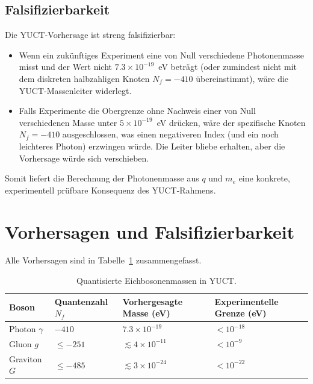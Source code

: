 \documentclass[12pt,a4paper]{article}
\begin{document}
	\subsection{Falsifizierbarkeit}
	
	Die YUCT-Vorhersage ist streng falsifizierbar:
	\begin{itemize}
		\item Wenn ein zukünftiges Experiment eine von Null verschiedene Photonenmasse misst und der Wert
		nicht \(7.3\times10^{-19}\)~eV beträgt (oder zumindest nicht mit dem diskreten halbzahligen Knoten
		\(N_f = -410\) übereinstimmt), wäre die YUCT-Massenleiter widerlegt.
		\item Falls Experimente die Obergrenze ohne Nachweis einer von Null verschiedenen Masse unter
		\(5\times10^{-19}\)~eV drücken, wäre der spezifische Knoten \(N_f = -410\) ausgeschlossen, was einen
		negativeren Index (und ein noch leichteres Photon) erzwingen würde. Die Leiter bliebe erhalten,
		aber die Vorhersage würde sich verschieben.
	\end{itemize}
	Somit liefert die Berechnung der Photonenmasse aus \(q\) und \(m_e\) eine konkrete, experimentell prüfbare
	Konsequenz des YUCT-Rahmens.
	
	\clearpage
	\section{Vorhersagen und Falsifizierbarkeit}
	
	Alle Vorhersagen sind in Tabelle~\ref{tab:predictions} zusammengefasst.
	
	\begin{table}[H]
		\centering
		\footnotesize
		\caption{Quantisierte Eichbosonenmassen in YUCT.}
		\label{tab:predictions}
		\begin{tabular}{p{3cm}p{3cm}p{3cm}p{3cm}}
			\toprule
			\textbf{Boson} & \textbf{Quantenzahl $N_f$} & \textbf{Vorhergesagte Masse (eV)} & \textbf{Experimentelle Grenze (eV)} \\
			\midrule
			Photon   $\gamma$ & $-410$ & $7.3 \times 10^{-19}$ & $< 10^{-18}$ \\
			Gluon    $g$      & $\le -251$ & $\lesssim 4 \times 10^{-11}$ & $< 10^{-9}$ \\
			Graviton $G$      & $\le -485$ & $\lesssim 3 \times 10^{-24}$ & $< 10^{-22}$ \\
			\bottomrule
		\end{tabular}
	\end{table}
	
\end{document}
